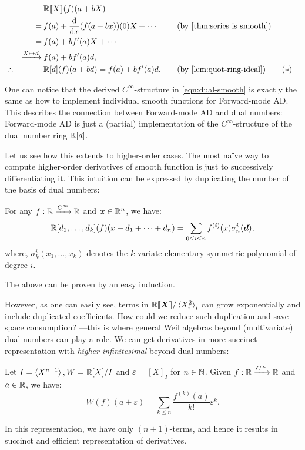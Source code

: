 \begin{alignat*}{3}
  &&&\R\llbracket{}X\rrbracket(f)(a + bX) \\
  &&=\:&f(a) + \frac{\mathrm d}{\mathrm{d} x}(f(a + bx))(0) X + \cdots
  &\quad&(\text{by \Cref{thm:series-is-smooth}})\\
  &&=\:&f(a) + b f'(a) X + \cdots\\
  &&\xrightarrow{X \mapsto d}\:&f(a) + bf'(a) d,\\
  &\therefore&& \R[d](f)(a + bd) = f(a) + b f'(a) d.
  && (\text{by \Cref{lem:quot-ring-ideal}}) \tag{\ensuremath{\ast}}
  \label{eqn:dual-smooth}
\end{alignat*}

One can notice that the derived $C^\infty$-structure in \eqref{eqn:dual-smooth} is exactly the same as how to implement individual smooth functions for Forward-mode AD.
This describes the connection between Forward-mode AD and dual numbers: Forward-mode AD is just a (partial) implementation of the $C^\infty$-structure of the dual number ring $\mathbb{R}[d]$.

Let us see how this extends to higher-order cases.
The most na\"{i}ve way to compute higher-order derivatives of smooth function is just to successively differentiating it.
This intuition can be expressed by duplicating the number of the basis of dual numbers:
\begin{theorem}\label{thm:univ-partial-duals}
  For any $f: \mathbb{R} \xrightarrow{C^\infty} \mathbb{R}$ and $\boldsymbol{x} \in \mathbb{R}^n$, we have:
  \[
    \R[d_1, \dots, d_k](f)(x + d_1 + \cdots + d_n) 
    = \sum_{0 \leq i \leq n} f^{(i)}(x)\sigma^i_n(\vec{d}),
  \]
  where, $\sigma^i_k(x_1, \dots, x_k)$ denotes the $k$-variate elementary symmetric polynomial of degree $i$.
\end{theorem}

The above can be proven by an easy induction.

However, as one can easily see, terms in $\mathord{\mathbb{R}\llbracket\boldsymbol{X}\rrbracket}/\braket{X_i^2}_i$ can grow exponentially and include duplicated coefficients.
How could we reduce such duplication and save space consumption? ---this is where general Weil algebras beyond (multivariate) dual numbers can play a role.
We can get derivatives in more succinct representation with \emph{higher infinitesimal} beyond dual numbers:

\begin{lemma}\label{lem:higher-infinitesimal}
  Let $I = \braket{X^{n + 1}}, W = \mathbb{R}[X]/I$ and $\varepsilon = {[X]}_I$ for $n \in \mathbb{N}$.
  Given $f: \mathbb{R} \xrightarrow{C^\infty} \mathbb{R}$ and $a \in \mathbb{R}$, we have:
  \[
    W(f)(a + \varepsilon)
    = \sum_{k \leq n} \frac{f^{(k)}(a)}{k !} \varepsilon^k.
  \]
\end{lemma}
In this representation, we have only $(n + 1)$-terms, and hence it results in succinct and efficient representation of derivatives.

